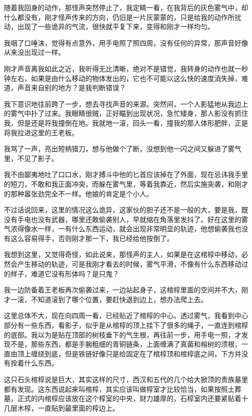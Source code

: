 随着我回身的动作，那怪声突然停止了，我定睛一看，在我背后的灰色雾气中，却什么都没有，刚才怪声传来的方向，仍旧是一片灰蒙蒙的，只是给我的动作所扰动，出现了一些诡异的气流，很快就平复下来，变得和刚才一样均匀。

我咽了口唾沫，觉得有点意外，用手电照了照四周，没有任何的异常，那声音好像从来没出现过一样。

刚才声音离我如此之近，我听得无比清晰，绝对不是错觉，我转身的动作也就一秒钟左右，如果是由什么移动的物体发出的，它也不可能以这么快的速度消失掉，难道，声音来自别的地方？是我判断错误？

我下意识地往前跨了一步，想去寻找声音的来源。突然间，一个人影猛地从我边上的雾气中扑了过来。我眼睛很贼，正好瞄到出现状况，急忙矮身，那人影没有抓住我，但是还是将我撞倒在地。我就地一滚，回头一看，撞我的那人体形肥胖，正是将我拉进这里的王老板。

我骂了一声，亮出短柄猎刀，想与他做个了断，没想到他一闪之间又躲进了雾气里，不见了影子。

我不由鄙夷地吐了口口水，刚才搏斗中他的匕首应该掉在了外面，现在忌讳我手里的短刀，不敢和我正面冲突，而躲在雾气里，等着我靠近，然后实施突袭，和刚才的那种嚣张劲完全不一样。他娘的肯定是个小人。

不过话说回来，这里的情况这么诡异，这家伙的胆子还不是一般的大，要是我，既没有手电也没有武器，哪里还敢偷袭别人，早就缩在角落里发抖了。好在这里的雾气浓得像水一样，一有什么东西运动，就会出现非常明显的轨迹，他想偷袭我也没有这么容易得手，否则刚才那一下，我已经给他按倒了。

我想到这里，又觉得奇怪，如此说来，那怪声的主人，如果是在这棺椁中移动，必然会产生移动的轨迹，可是我刚才看去的时候，雾气平滑，不像有什么东西移动过的样子，难道它没有形体吗？是只鬼？

我一边防备着王老板再次偷袭过来，一边站起身子，这棺椁里面的空间并不大，刚才一滚，不知道滚到了哪个位置，要赶快退到边上，想办法爬上去。

这里总体不大，现在向四周一看，已经贴近了棺椁的中心。透过雾气，我看到中心部分有一些东西，看影子，似乎是从棺椁的顶上挂下了很多的绳子，一直连到棺椁的底部。我以为是贴在顶部的树枝垂下的气生根，再往前一步，用手电一照，才发现不是，那些东西，都是手腕粗细的青铜链条，上面缠满了真菌和榕树的须根，一直由顶上缠绕到底，但是铁链好像只是给固定在了棺椁顶和棺椁底之间，下方并没有拴着什么东西。

这只石头棺椁说是巨大，其实这样的尺寸，西汉和五代的几个给大掀顶的贵族墓里都有发现。这东西说起来叫棺椁，其实应该叫做椁室才比较恰当，如果按照土葬墓，正式的内棺椁应该放在这个椁室的中央，财力雄厚的，石椁室内还要紧贴着十几层木椁，一直贴到最里面的椁边上。

